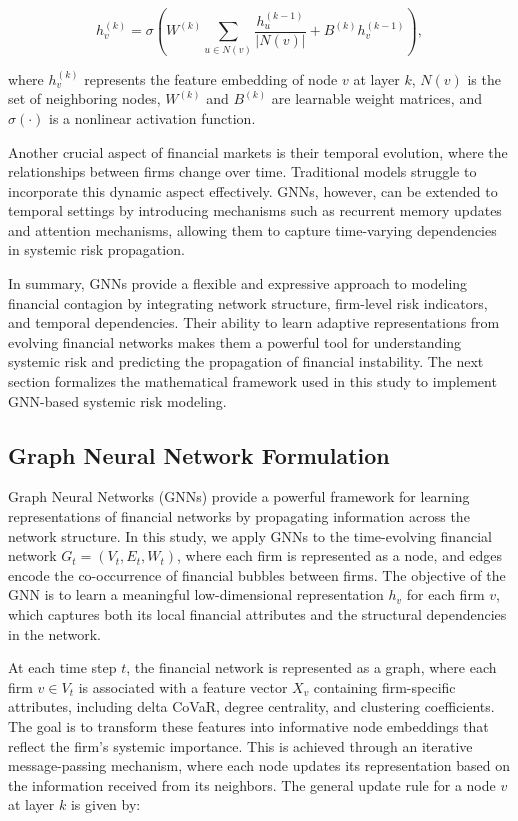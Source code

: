 \documentclass[preprint,12pt,authoryear]{elsarticle}
\begin{document}
\[
h_v^{(k)} = \sigma \left( W^{(k)} \sum_{u \in N(v)} \frac{h_u^{(k-1)}}{|N(v)|} + B^{(k)} h_v^{(k-1)} \right),
\]

where \( h_v^{(k)} \) represents the feature embedding of node \( v \) at layer \( k \), \( N(v) \) is the set of neighboring nodes, \( W^{(k)} \) and \( B^{(k)} \) are learnable weight matrices, and \( \sigma(\cdot) \) is a nonlinear activation function.  

Another crucial aspect of financial markets is their temporal evolution, where the relationships between firms change over time. Traditional models struggle to incorporate this dynamic aspect effectively. GNNs, however, can be extended to temporal settings by introducing mechanisms such as recurrent memory updates and attention mechanisms, allowing them to capture time-varying dependencies in systemic risk propagation.  

In summary, GNNs provide a flexible and expressive approach to modeling financial contagion by integrating network structure, firm-level risk indicators, and temporal dependencies. Their ability to learn adaptive representations from evolving financial networks makes them a powerful tool for understanding systemic risk and predicting the propagation of financial instability. The next section formalizes the mathematical framework used in this study to implement GNN-based systemic risk modeling.


\subsection{Graph Neural Network Formulation}  

Graph Neural Networks (GNNs) provide a powerful framework for learning representations of financial networks by propagating information across the network structure. In this study, we apply GNNs to the time-evolving financial network \( G_t = (V_t, E_t, W_t) \), where each firm is represented as a node, and edges encode the co-occurrence of financial bubbles between firms. The objective of the GNN is to learn a meaningful low-dimensional representation \( h_v \) for each firm \( v \), which captures both its local financial attributes and the structural dependencies in the network.  

At each time step \( t \), the financial network is represented as a graph, where each firm \( v \in V_t \) is associated with a feature vector \( X_v \) containing firm-specific attributes, including delta CoVaR, degree centrality, and clustering coefficients. The goal is to transform these features into informative node embeddings that reflect the firm's systemic importance. This is achieved through an iterative message-passing mechanism, where each node updates its representation based on the information received from its neighbors. The general update rule for a node \( v \) at layer \( k \) is given by:
\end{document}
